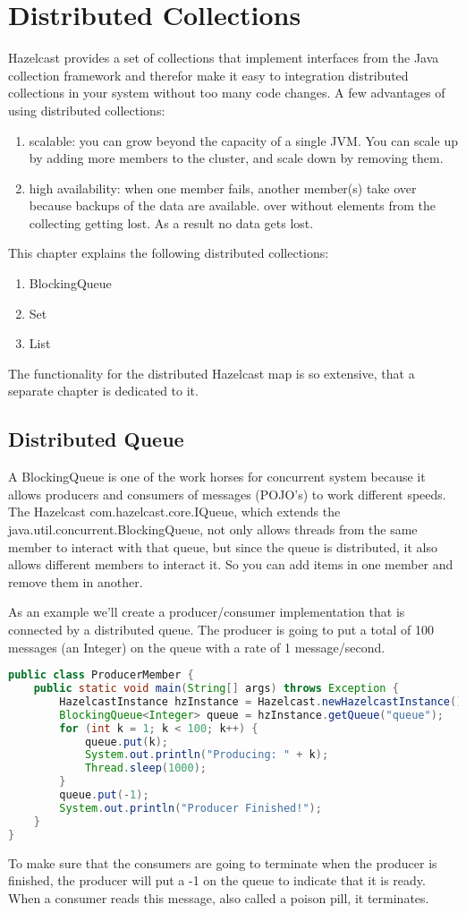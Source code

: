 \chapter{Distributed Collections}
Hazelcast provides a set of collections that implement interfaces from the Java collection framework and therefor make it easy to integration distributed collections in your system without too many code changes. A few advantages of using distributed collections:
\begin{enumerate}
\item scalable: you can grow beyond the capacity of a single JVM. You can scale up by adding more members to the cluster, and scale down by removing them.
\item high availability: when one member fails, another member(s) take over because backups of the data are available. over without elements from the collecting getting lost. As a result no data gets lost.
\end{enumerate}

This chapter explains the following distributed collections:
\begin{enumerate}
\item BlockingQueue
\item Set
\item List
\end{enumerate}
The functionality for the distributed Hazelcast map is so extensive, that a separate chapter is dedicated to it. 

\section{Distributed Queue}
A BlockingQueue is one of the work horses for concurrent system because it allows producers and consumers of messages (POJO's) to work different speeds. The Hazelcast com.hazelcast.core.IQueue, which extends the java.util.concurrent.BlockingQueue, not only allows threads from the same member to interact with that queue, but since the queue is distributed, it also allows different members to interact it. So you can add items in one member and remove them in another.

As an example we'll create a producer/consumer implementation that is connected by a distributed queue. The producer is going to put a total of 100 messages (an Integer) on the queue with a rate of 1 message/second.
\begin{lstlisting}[language=java]
public class ProducerMember {
    public static void main(String[] args) throws Exception {
        HazelcastInstance hzInstance = Hazelcast.newHazelcastInstance();
        BlockingQueue<Integer> queue = hzInstance.getQueue("queue");
        for (int k = 1; k < 100; k++) {
            queue.put(k);
            System.out.println("Producing: " + k);
            Thread.sleep(1000);
        }
        queue.put(-1);
        System.out.println("Producer Finished!");
    }
}
\end{lstlisting}
To make sure that the consumers are going to terminate when the producer is finished, the producer will put a -1 on the queue to indicate that it is ready. When a consumer reads this message, also called a poison pill, it terminates. 

